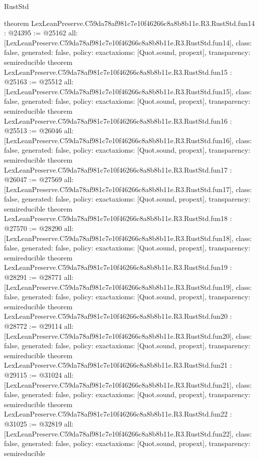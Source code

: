 \begin{lexlean}{RustStd}
\begin{coremodule}
{}
theorem LexLeanPreserve.C59da78af981c7e10f46266c8a8b8b11e.R3.RustStd.fun14 : @24395 := @25162 {
  all: [LexLeanPreserve.C59da78af981c7e10f46266c8a8b8b11e.R3.RustStd.fun14],
  class: false,
  generated: false,
  policy: exact{axioms: [Quot.sound, propext]},
  transparency: semireducible
}
theorem LexLeanPreserve.C59da78af981c7e10f46266c8a8b8b11e.R3.RustStd.fun15 : @25163 := @25512 {
  all: [LexLeanPreserve.C59da78af981c7e10f46266c8a8b8b11e.R3.RustStd.fun15],
  class: false,
  generated: false,
  policy: exact{axioms: [Quot.sound, propext]},
  transparency: semireducible
}
theorem LexLeanPreserve.C59da78af981c7e10f46266c8a8b8b11e.R3.RustStd.fun16 : @25513 := @26046 {
  all: [LexLeanPreserve.C59da78af981c7e10f46266c8a8b8b11e.R3.RustStd.fun16],
  class: false,
  generated: false,
  policy: exact{axioms: [Quot.sound, propext]},
  transparency: semireducible
}
theorem LexLeanPreserve.C59da78af981c7e10f46266c8a8b8b11e.R3.RustStd.fun17 : @26047 := @27569 {
  all: [LexLeanPreserve.C59da78af981c7e10f46266c8a8b8b11e.R3.RustStd.fun17],
  class: false,
  generated: false,
  policy: exact{axioms: [Quot.sound, propext]},
  transparency: semireducible
}
theorem LexLeanPreserve.C59da78af981c7e10f46266c8a8b8b11e.R3.RustStd.fun18 : @27570 := @28290 {
  all: [LexLeanPreserve.C59da78af981c7e10f46266c8a8b8b11e.R3.RustStd.fun18],
  class: false,
  generated: false,
  policy: exact{axioms: [Quot.sound, propext]},
  transparency: semireducible
}
theorem LexLeanPreserve.C59da78af981c7e10f46266c8a8b8b11e.R3.RustStd.fun19 : @28291 := @28771 {
  all: [LexLeanPreserve.C59da78af981c7e10f46266c8a8b8b11e.R3.RustStd.fun19],
  class: false,
  generated: false,
  policy: exact{axioms: [Quot.sound, propext]},
  transparency: semireducible
}
theorem LexLeanPreserve.C59da78af981c7e10f46266c8a8b8b11e.R3.RustStd.fun20 : @28772 := @29114 {
  all: [LexLeanPreserve.C59da78af981c7e10f46266c8a8b8b11e.R3.RustStd.fun20],
  class: false,
  generated: false,
  policy: exact{axioms: [Quot.sound, propext]},
  transparency: semireducible
}
theorem LexLeanPreserve.C59da78af981c7e10f46266c8a8b8b11e.R3.RustStd.fun21 : @29115 := @31024 {
  all: [LexLeanPreserve.C59da78af981c7e10f46266c8a8b8b11e.R3.RustStd.fun21],
  class: false,
  generated: false,
  policy: exact{axioms: [Quot.sound, propext]},
  transparency: semireducible
}
theorem LexLeanPreserve.C59da78af981c7e10f46266c8a8b8b11e.R3.RustStd.fun22 : @31025 := @32819 {
  all: [LexLeanPreserve.C59da78af981c7e10f46266c8a8b8b11e.R3.RustStd.fun22],
  class: false,
  generated: false,
  policy: exact{axioms: [Quot.sound, propext]},
  transparency: semireducible
}
\end{coremodule}
\end{lexlean}
